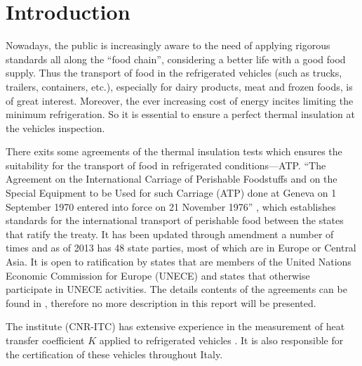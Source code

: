 \section{Introduction}
Nowadays, the public is increasingly aware to the need of applying rigorous standards all along the ``food chain'', considering a better life with a good food supply.  Thus the transport of food in the refrigerated vehicles (such as trucks, trailers, containers, etc.), especially for dairy products, meat and frozen foods, is of great interest. Moreover, the ever increasing cost of energy incites limiting the minimum refrigeration. So it is essential to ensure a perfect thermal insulation at the vehicles inspection. 

There exits some agreements of the thermal insulation tests which ensures the suitability for the transport of food in refrigerated conditions---ATP.
``The Agreement on the International Carriage of Perishable Foodstuffs and on the Special Equipment to be Used for such Carriage (ATP) done at Geneva on 1 September 1970 entered into force on 21 November 1976'' \citep{Geneva1970}, which establishes standards for the international transport of perishable food between the states that ratify the treaty. It has been updated through amendment a number of times and as of 2013 has 48 state parties, most of which are in Europe or Central Asia. It is open to ratification by states that are members of the United Nations Economic Commission for Europe (UNECE) and states that otherwise participate in UNECE activities\citep{ATP_wiki}.
The details contents of the agreements can be found in \citep{ATP_wiki, rossi2009k}, therefore no more description in this report will be presented.

The institute (CNR-ITC) has extensive experience in the measurement of heat transfer coefficient $K$ applied to refrigerated vehicles \citep{rossi2009k,bison1993automatic,bison2012geometrical,dragano2009experimental,grinzato2010r}. It is also responsible for the certification of these vehicles throughout Italy.

